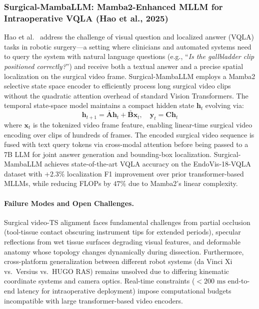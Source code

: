 \subsubsection{Surgical-MambaLLM: Mamba2-Enhanced MLLM for Intraoperative VQLA (Hao et al., 2025)}
Hao et al.~\cite{Hao2025SurgicalMambaLLM} address the challenge of visual question and localized answer (VQLA) tasks in robotic surgery---a setting where clinicians and automated systems need to query the system with natural language questions (e.g., ``\textit{Is the gallbladder clip positioned correctly?}'') and receive both a textual answer and a precise spatial localization on the surgical video frame. Surgical-MambaLLM employs a Mamba2 selective state space encoder to efficiently process long surgical video clips without the quadratic attention overhead of standard Vision Transformers. The temporal state-space model maintains a compact hidden state $\mathbf{h}_t$ evolving via:
\begin{equation}
    \mathbf{h}_{t+1} = \mathbf{\bar{A}}\mathbf{h}_t + \mathbf{\bar{B}}\mathbf{x}_t, \quad \mathbf{y}_t = \mathbf{C}\mathbf{h}_t
\end{equation}
where $\mathbf{x}_t$ is the tokenized video frame feature, enabling linear-time surgical video encoding over clips of hundreds of frames. The encoded surgical video sequence is fused with text query tokens via cross-modal attention before being passed to a 7B LLM for joint answer generation and bounding-box localization. Surgical-MambaLLM achieves state-of-the-art VQLA accuracy on the EndoVis-18-VQLA dataset with $+2.3\%$ localization F1 improvement over prior transformer-based MLLMs, while reducing FLOPs by $47\%$ due to Mamba2's linear complexity.

\paragraph{Failure Modes and Open Challenges.}
Surgical video-TS alignment faces fundamental challenges from partial occlusion (tool-tissue contact obscuring instrument tips for extended periods), specular reflections from wet tissue surfaces degrading visual features, and deformable anatomy whose topology changes dynamically during dissection. Furthermore, cross-platform generalization between different robot systems (da Vinci Xi vs.\ Versius vs.\ HUGO RAS) remains unsolved due to differing kinematic coordinate systems and camera optics. Real-time constraints ($<\!200\text{ ms}$ end-to-end latency for intraoperative deployment) impose computational budgets incompatible with large transformer-based video encoders.

